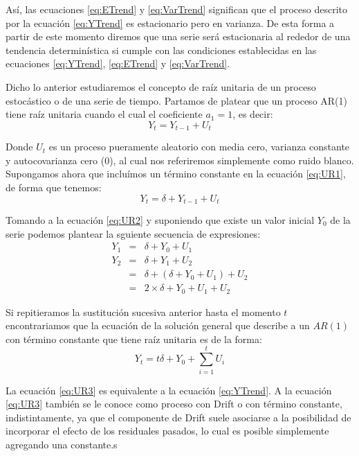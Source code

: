 \documentclass[
]{book}
\begin{document}
Así, las ecuaciones \eqref{eq:ETrend} y \eqref{eq:VarTrend} significan que el proceso descrito por la ecuación \eqref{eq:YTrend} es estacionario pero en varianza. De esta forma a partir de este momento diremos que una serie será estacionaria al rededor de una tendencia determinística si cumple con las condiciones establecidas en las ecuaciones \eqref{eq:YTrend}, \eqref{eq:ETrend} y \eqref{eq:VarTrend}.

Dicho lo anterior estudiaremos el concepto de raíz unitaria de un proceso estocástico o de una serie de tiempo. Partamos de platear que un proceso AR(1) tiene raíz unitaria cuando el cual el coeficiente \(a_1 = 1\), es decir:
\begin{equation}
    Y_t = Y_{t-1} + U_t
    \label{eq:UR1}
\end{equation}

Donde \(U_t\) es un proceso pueramente aleatorio con media cero, varianza constante y autocovarianza cero (0), al cual nos referiremos simplemente como ruido blanco. Supongamos ahora que incluímos un término constante en la ecuación \eqref{eq:UR1}, de forma que tenemos:
\begin{equation}
    Y_t = \delta + Y_{t-1} + U_t
    \label{eq:UR2}
\end{equation}

Tomando a la ecuación \eqref{eq:UR2} y suponiendo que existe un valor inicial \(Y_0\) de la serie podemos plantear la sguiente secuencia de expresiones:
\begin{eqnarray*}
    Y_1 & = & \delta + Y_0 + U_1 \\
    Y_2 & = & \delta + Y_1 + U_2 \\
    & = & \delta + (\delta + Y_0 + U_1) + U_2 \\
    & = & 2 \times \delta + Y_0 + U_1 + U_2
\end{eqnarray*}

Si repitieramos la sustitución sucesiva anterior hasta el momento \(t\) encontrariamos que la ecuación de la solución general que describe a un \(AR(1)\) con término constante que tiene raíz unitaria es de la forma:
\begin{equation}
    Y_t = t \delta + Y_0 + \sum_{i=1}^t U_i
    \label{eq:UR3}
\end{equation}

La ecuación \eqref{eq:UR3} es equivalente a la ecuación \eqref{eq:YTrend}. A la ecuación \eqref{eq:UR3} también se le conoce como proceso con Drift o con término constante, indistintamente, ya que el componente de Drift suele asociarse a la posibilidad de incorporar el efecto de los residuales pasados, lo cual es posible simplemente agregando una constante.s
\end{document}
